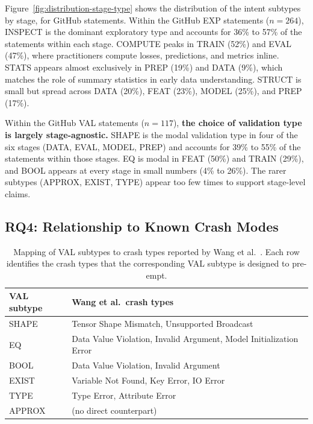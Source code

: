 \documentclass[a4paper,USenglish,cleveref,autoref,thm-restate,anonymous]{lipics-v2021}       %
\begin{document}
Figure~\ref{fig:distribution-stage-type}
shows the distribution of the intent subtypes by stage, for GitHub statements.
Within the GitHub EXP statements ($n=264$),
INSPECT is the dominant exploratory type
and accounts for 36\% to 57\% of the statements within each stage.
COMPUTE peaks in TRAIN (52\%) and EVAL (47\%),
where practitioners compute losses, predictions, and metrics inline.
STATS appears almost exclusively in PREP (19\%) and DATA (9\%),
which matches the role of summary statistics in early data understanding.
STRUCT is small but spread across DATA (20\%), FEAT (23\%), MODEL (25\%), and PREP (17\%).

Within the GitHub VAL statements ($n=117$),
\textbf{the choice of validation type is largely stage-agnostic.}
SHAPE is the modal validation type in four of the six stages
(DATA, EVAL, MODEL, PREP)
and accounts for 39\% to 55\% of the statements within those stages.
EQ is modal in FEAT (50\%) and TRAIN (29\%),
and BOOL appears at every stage in small numbers (4\% to 26\%).
The rarer subtypes (APPROX, EXIST, TYPE) appear too few times
to support stage-level claims.

\subsection{RQ4: Relationship to Known Crash Modes}
\label{sec:rq4}

\begin{table}
  \centering
  \caption{Mapping of VAL subtypes to crash types reported by Wang et al.~\cite{wang2025why}.
  Each row identifies the crash types that the corresponding VAL subtype is designed to pre-empt.}
  \label{tab:wang-mapping}
  \begin{tabularx}{\textwidth}{l X}
    \toprule
    \textbf{VAL subtype} & \textbf{Wang et al.\ crash types} \\
    \midrule
    SHAPE  & Tensor Shape Mismatch, Unsupported Broadcast\\
    EQ     & Data Value Violation, Invalid Argument, Model Initialization Error \\
    BOOL   & Data Value Violation, Invalid Argument \\
    EXIST  & Variable Not Found, Key Error, IO Error \\
    TYPE   & Type Error, Attribute Error \\
    APPROX & (no direct counterpart) \\
    \bottomrule
  \end{tabularx}
\end{table}
\end{document}
